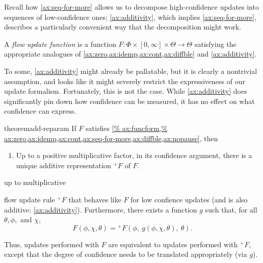 Recall how \cref{ax:seq-for-more} allows us to decompose high-confidence updates into sequences of low-confidence ones;
\cref{ax:additivity},
which implies \cref{ax:seq-for-more}, describes a particularly convenient
way that the decomposition might work. 

\begin{defn}
	A \emph{flow update function}
	is a function
	$F : \Phi \times[0,\infty] \times \Theta\to \Theta$
	satisfying the appropriate analogues of
	\cref{ax:zero,ax:idemp,ax:cont,ax:diffble}
	and \cref{ax:additivity}.
\end{defn}

To some,
\cref{ax:additivity} might already be pallatable,
but it is clearly a nontrivial assumption, and looks like it might severely restrict the expressiveness of our update formalism.
Fortunately, this is not the case.
While \cref{ax:additivity} does significantly pin down how confidence 
can be measured, it has no effect on what confidence can express.  


\begin{linked}{theorem}{add-reparam}
	If $F$ satisfies \cref{%
		ax:funcform,%
		ax:zero,ax:idemp,ax:cont,ax:seq-for-more,ax:diffble,ax:nopause},
	then
	\begin{enumerate}
		\item Up to a positive multiplicative factor, in its confidence
		argument, there is a unique additive representation
		$^+\!F$ of $F$. 
	\end{enumerate}
	
	up to multiplicative 
	
	flow update rule
	 $^+\!F$
	that behaves like $F$ for low confience updates
	(and is also additive: \cref{ax:additivity}). 
	Furthermore, there exists a function 
	$g$ such that,
	for all $\theta,\phi,$ and $\chi$,
	\[
		F( \phi, 
			\chi,
		 \theta )
		 =
		{^+}\!F(\phi,~ 
		g(\phi,\chi,\theta),~
		 \theta).
	\]
\end{linked}
Thus, updates performed with $F$ are equivalent
to updates performed with ${^+}\!F$, except that
the degree of confidence needs to be translated appropriately (via $g$).


